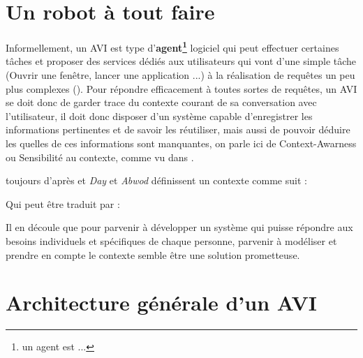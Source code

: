\section{Un robot à tout faire}\label{spa-def}
Informellement, un AVI est type d'\textbf{agent\footnote{un agent est ...}} logiciel qui peut effectuer certaines tâches et proposer des services dédiés aux utilisateurs qui vont d'une simple tâche (Ouvrir une fenêtre, lancer une application ...) à la réalisation de requêtes un peu plus complexes ().
Pour répondre efficacement à toutes sortes de requêtes, un AVI se doit donc de garder trace du contexte courant de sa conversation avec l'utilisateur, il doit donc disposer d'un système capable d'enregistrer les informations pertinentes et de savoir les réutiliser, mais aussi de pouvoir déduire les quelles de ces informations sont manquantes, on parle ici de Context-Awarness ou Sensibilité au contexte, comme vu dans \cite{SPA-overview}.
\par toujours d'après \cite{SPA-overview} et \cite{Dey-Abwod}
\textit{Day} et \textit{Abwod} définissent un contexte comme suit : 
\begin{quote}\label{context-def}
\end{quote}
Qui peut être traduit par :
\begin{quote}\label{context-def-fr}
\end{quote}
Il en découle que pour parvenir à développer un système qui puisse répondre aux besoins individuels et spécifiques de chaque personne, parvenir à modéliser et prendre en compte le contexte semble être une solution prometteuse.

\section{Architecture générale d'un AVI}
